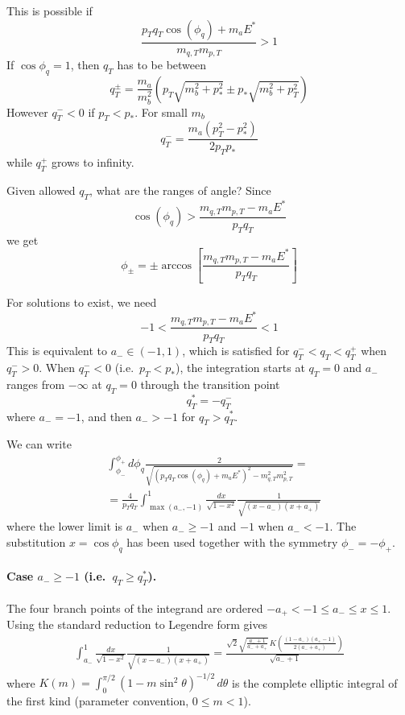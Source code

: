 This is possible if
\begin{equation}
\frac{p_T q_T \cos(\phi_q) + m_a E^*}{m_{q,T} m_{p,T}}>1
\end{equation}
If $\cos \phi_q=1$, then $q_T$ has to be between
\begin{equation}
    q_T^\pm = \frac{m_a}{m_b^2} (p_T \sqrt{m_b^2+p_*^2} \pm p_* \sqrt{m_b^2+p_T^2})
\end{equation}
However $q_T^-<0$ if $p_T<p_*$.
For small $m_b$
\begin{equation}
    q_T^- = \frac{m_a(p_T^2-p_*^2) }{2p_T p_*}
\end{equation}
while $q_T^+$ grows to infinity.

Given allowed $q_T$, what are the ranges of angle?
Since
\begin{equation}
\cos(\phi_q)>\frac{{m_{q,T} m_{p,T}}-m_a E^*}{p_T q_T}
\end{equation}
we get
\begin{equation}
    \phi_{\pm} = \pm \arccos\left[\frac{{m_{q,T} m_{p,T}}-m_a E^*}{p_T q_T}\right]
\end{equation}

For solutions to exist, we need
\begin{equation}
 -1<   \frac{{m_{q,T} m_{p,T}}-m_a E^*}{p_T q_T} <1
\end{equation}
This is equivalent to $a_- \in (-1, 1)$, which is satisfied for $q_T^- < q_T < q_T^+$ when $q_T^->0$.
When $q_T^- < 0$ (i.e.\ $p_T < p_*$), the integration starts at $q_T=0$ and $a_-$ ranges from $-\infty$ at $q_T=0$ through the transition point
\begin{equation}
    q_T^* = -q_T^-
\end{equation}
where $a_-=-1$, and then $a_->-1$ for $q_T > q_T^*$.

We can write
\begin{align}
&\int_{\phi_-}^{\phi_+} d \phi_q  \frac{2}{\sqrt{(p_T q_T \cos(\phi_q) + m_a E^*)^2 -m^2_{q,T} m^2_{p,T}}}=\\
&=\frac{4}{p_T q_T}\int_{\max(a_-,-1)}^1 \frac{dx}{\sqrt{1-x^2}}   \frac{1}{\sqrt{(x -a_-)(x+a_+)}}
\end{align}
where the lower limit is $a_-$ when $a_- \geq -1$ and $-1$ when $a_- < -1$. The substitution $x = \cos\phi_q$ has been used together with the symmetry $\phi_- = -\phi_+$.

\paragraph{Case $a_- \geq -1$ (i.e.\ $q_T \geq q_T^*$).}
The four branch points of the integrand are ordered $-a_+ < -1 \leq a_- \leq x \leq 1$. Using the standard reduction to Legendre form gives
\begin{align}
\int_{a_-}^1 \frac{dx}{\sqrt{1-x^2}}   \frac{1}{\sqrt{(x -a_-)(x+a_+)}}
= \frac{\sqrt{2} \sqrt{\frac{a_{-}+1}{a_{-}+a_{+}}} \, K\!\left(\frac{(1-a_-) (a_+-1)}{2 (a_{-}+a_{+})}\right)}{\sqrt{a_-+1}}
\end{align}
where $K(m) = \int_0^{\pi/2}(1 - m\sin^2\theta)^{-1/2}\,d\theta$ is the complete elliptic integral of the first kind (parameter convention, $0\leq m < 1$).

